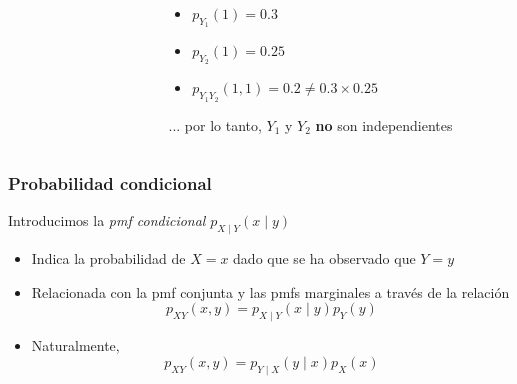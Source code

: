 \documentclass[xcolor=dvipsnames,10pt]{beamer}
\begin{document}
\begin{frame}
\begin{columns}
\begin{column}{0.48\textwidth}
\begin{figure}
      \end{figure}
    \end{column}
    \begin{column}{0.48\textwidth}
      \begin{itemize}
      \item $p_{Y_1}(1) = 0.3$
      \item $p_{Y_2}(1) = 0.25$
      \item $p_{Y_1 Y_2}(1, 1) = 0.2 \neq 0.3 \times 0.25$
      \end{itemize}
      ... por lo tanto, $Y_1$ y $Y_2$ \textbf{no} son independientes
    \end{column}
  \end{columns}
\end{frame}
%
\begin{frame}
  \frametitle{Probabilidad condicional}
  Introducimos la \emph{pmf condicional} $p_{X \mid Y}(x \mid y)$
  \begin{itemize}
  \item Indica la probabilidad de $X = x$ dado que se ha observado que $Y = y$
  \item Relacionada con la pmf conjunta y las pmfs marginales a través de la relación
    \begin{equation*}
      p_{XY}(x, y) = p_{X \mid Y}(x \mid y) p_Y(y)
    \end{equation*}
  \item Naturalmente,
    \begin{equation*}
      p_{XY}(x, y) = p_{Y \mid X} (y \mid x) p_X(x)
    \end{equation*}
  \end{itemize}
\end{frame}
%
\end{document}
